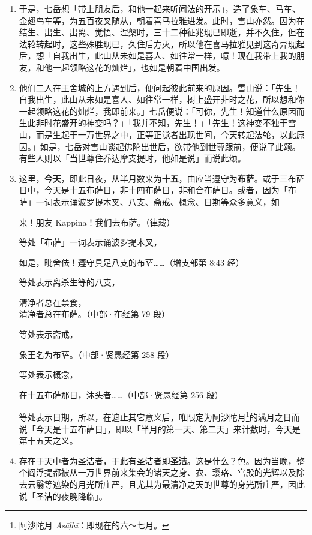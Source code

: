 \begin{enumerate}
\item 于是，七岳想「带上朋友后，和他一起来听闻法的开示」，造了象车、马车、金翅鸟车等，为五百夜叉随从，朝着喜马拉雅进发。此时，雪山亦然。因为在结生、出生、出离、觉悟、涅槃时，三十二种征兆现已即逝，并不久住，但在法轮转起时，这些殊胜现已，久住后方灭，所以他在喜马拉雅见到这奇异现起后，想「自我出生，此山从未如是喜人、如往常一样，噫！现在我带上我的朋友，和他一起领略这花的灿烂」，也如是朝着中国出发。
\item 他们二人在王舍城的上方遇到后，便问起彼此前来的原因。雪山说：「先生！自我出生，此山从未如是喜人、如往常一样，树上盛开非时之花，所以想和你一起领略这花的灿烂，我即前来。」七岳便说：「可你，先生！知道什么原因而生此非时花盛开的神变吗？」「我并不知，先生！」「先生！这神变不独于雪山，而是生起于一万世界之中，正等正觉者出现世间，今天转起法轮，以此原因。」如是，七岳对雪山谈起佛陀出世后，欲带他到世尊跟前，便说了此颂。有些人则以「当世尊住乔达摩支提时，他如是说」而说此颂。
\item 这里，\textbf{今天}，即此日夜，从半月数来为\textbf{十五}，由应当遵守为\textbf{布萨}。或于三布萨日中，今天是十五布萨日，非十四布萨日，非和合布萨日。或者，因为「布萨」一词表示诵波罗提木叉、八支、斋戒、概念、日期等众多意义，如\begin{quoting}来！朋友 Kappina！我们去布萨。（律藏）\end{quoting}等处「布萨」一词表示诵波罗提木叉，\begin{quoting}如是，毗舍佉！遵守具足八支的布萨……（增支部第 8:43 经）\end{quoting}等处表示离杀生等的八支，\begin{quoting}清净者总在禁食，\\清净者总在布萨。（中部·布经第 79 段）\end{quoting}等处表示斋戒，\begin{quoting}象王名为布萨。（中部·贤愚经第 258 段）\end{quoting}等处表示概念，\begin{quoting}在十五布萨那日，沐头者……（中部·贤愚经第 256 段）\end{quoting}等处表示日期，所以，在遮止其它意义后，唯限定为阿沙陀月\footnote{阿沙陀月 \textit{Āsāḷhī}：即现在的六～七月。}的满月之日而说「今天是十五布萨日」，即以「半月的第一天、第二天」来计数时，今天是第十五天之义。
\item 存在于天中者为圣洁者，于此有圣洁者即\textbf{圣洁}。这是什么？色。因为当晚，整个阎浮提都被从一万世界前来集会的诸天之身、衣、璎珞、宫殿的光辉以及除去云翳等遮染的月光所庄严，且尤其为最清净之天的世尊的身光所庄严，因此说「圣洁的夜晚降临」。

\end{enumerate}
